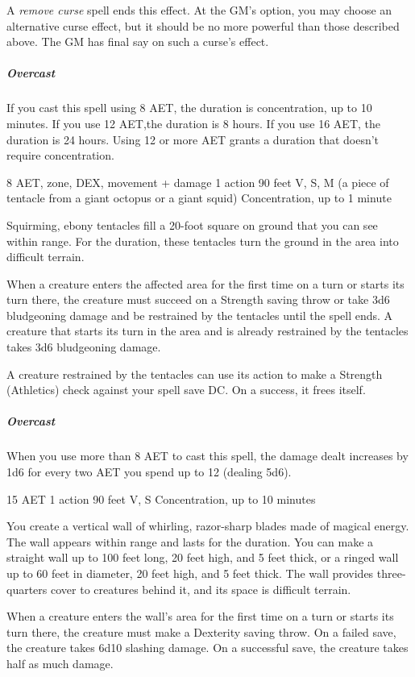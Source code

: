 A \textit{remove curse} spell ends this effect. At the GM's option, you may choose an alternative curse effect, but it should be no more powerful than those described above. The GM has final say on such a curse's effect.

\subparagraph*{Overcast} If you cast this spell using 8 AET, the duration is concentration, up to 10 minutes. If you use 12 AET,the duration is 8 hours. If you use 16 AET, the duration is 24 hours. Using 12 or more AET grants a duration that doesn't require concentration.


{8 AET, zone, DEX, movement + damage}
{1 action}
{90 feet}
{V, S, M (a piece of tentacle from a giant octopus or a giant squid)}
{Concentration, up to 1 minute}

Squirming, ebony tentacles fill a 20-foot square on ground that you can see within range. For the duration, these tentacles turn the ground in the area into difficult terrain.

When a creature enters the affected area for the first time on a turn or starts its turn there, the creature must succeed on a Strength saving throw or take 3d6 bludgeoning damage and be restrained by the tentacles until the spell ends. A creature that starts its turn in the area and is already restrained by the tentacles takes 3d6 bludgeoning damage.

A creature restrained by the tentacles can use its action to make a Strength (Athletics) check against your spell save DC. On a success, it frees itself.
\subparagraph*{Overcast} When you use more than 8 AET to cast this spell, the damage dealt increases by 1d6 for every two AET you spend up to 12 (dealing 5d6).

{15 AET}
{1 action}
{90 feet}
{V, S}
{Concentration, up to 10 minutes}

You create a vertical wall of whirling, razor-sharp blades made of magical energy. The wall appears within range and lasts for the duration. You can make a straight wall up to 100 feet long, 20 feet high, and 5 feet thick, or a ringed wall up to 60 feet in diameter, 20 feet high, and 5 feet thick. The wall provides three-quarters cover to creatures behind it, and its space is difficult terrain.

When a creature enters the wall’s area for the first time on a turn or starts its turn there, the creature must make a Dexterity saving throw. On a failed save, the creature takes 6d10 slashing damage. On a successful save, the creature takes half as much damage.


